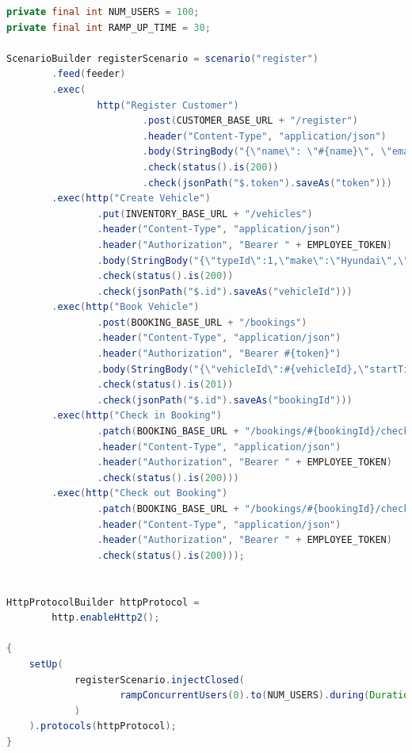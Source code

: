 \begin{codigo}[H]
    \begin{lstlisting}[language=Java]
private final int NUM_USERS = 100;
private final int RAMP_UP_TIME = 30;

ScenarioBuilder registerScenario = scenario("register")
        .feed(feeder)
        .exec(
                http("Register Customer")
                        .post(CUSTOMER_BASE_URL + "/register")
                        .header("Content-Type", "application/json")
                        .body(StringBody("{\"name\": \"#{name}\", \"email\": \"#{email}\", \"password\": \"#{password}\"}"))
                        .check(status().is(200))
                        .check(jsonPath("$.token").saveAs("token")))
        .exec(http("Create Vehicle")
                .put(INVENTORY_BASE_URL + "/vehicles")
                .header("Content-Type", "application/json")
                .header("Authorization", "Bearer " + EMPLOYEE_TOKEN)
                .body(StringBody("{\"typeId\":1,\"make\":\"Hyundai\",\"model\":\"Creta\",\"year\":2024,\"mileage\":10000,\"licensePlate\":\"23525\",\"chassisNumber\":\"252355125\",\"engineNumber\":\"234242\",\"color\":\"white\"}"))
                .check(status().is(200))
                .check(jsonPath("$.id").saveAs("vehicleId")))
        .exec(http("Book Vehicle")
                .post(BOOKING_BASE_URL + "/bookings")
                .header("Content-Type", "application/json")
                .header("Authorization", "Bearer #{token}")
                .body(StringBody("{\"vehicleId\":#{vehicleId},\"startTime\":\"2024-12-03T10:15:30\",\"endTime\":\"2024-12-04T10:15:30\"}"))
                .check(status().is(201))
                .check(jsonPath("$.id").saveAs("bookingId")))
        .exec(http("Check in Booking")
                .patch(BOOKING_BASE_URL + "/bookings/#{bookingId}/check-in")
                .header("Content-Type", "application/json")
                .header("Authorization", "Bearer " + EMPLOYEE_TOKEN)
                .check(status().is(200)))
        .exec(http("Check out Booking")
                .patch(BOOKING_BASE_URL + "/bookings/#{bookingId}/check-out")
                .header("Content-Type", "application/json")
                .header("Authorization", "Bearer " + EMPLOYEE_TOKEN)
                .check(status().is(200)));


HttpProtocolBuilder httpProtocol =
        http.enableHttp2();

{
    setUp(
            registerScenario.injectClosed(
                    rampConcurrentUsers(0).to(NUM_USERS).during(Duration.ofMinutes(RAMP_UP_TIME))
            )
    ).protocols(httpProtocol);
}
    \end{lstlisting}
    \caption{Teste de carga}
    \label{cod:test-carga}
\end{codigo}